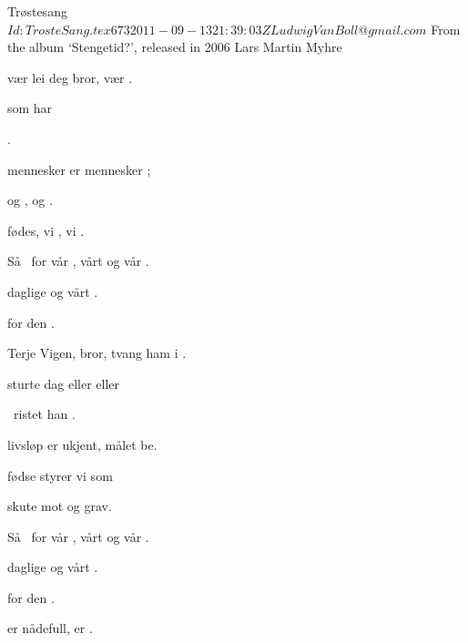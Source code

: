 \begin{SBSong}{Tr\o stesang}
  {$Id: TrosteSang.tex 673 2011-09-13 21:39:03Z LudwigVanBoll@gmail.com $}
  {From the album `Stengetid?', released in 2006}
  {Lars Martin Myhre}
  \begin{SBVerse}
	 v\ae r lei deg bror,  v\ae r . 

	  som  har 

	  .
	
	 mennesker er  mennesker ; 

	 og ,  og .

	 f\o des, vi , vi .
  \end{SBVerse}
  \begin{SBChorus}
	S\aa\  for v\aa r , v\aa rt  og v\aa r . 

	 daglige  og v\aa rt  . 

	 for den  .
  \end{SBChorus}
  \begin{SBVerse}
	 Terje Vigen, bror,  tvang ham i .

	 sturte  dag eller  eller  
	
	\ ristet han  .

	 livsl\o p er ukjent,  m\aa let be. 
	
	 f\o dse styrer vi  som  
	
	 skute mot  og  grav.
  \end{SBVerse}
  \begin{SBChorus}
	S\aa\  for v\aa r , v\aa rt  og v\aa r . 
	
	 daglige  og v\aa rt  . 
	
	 for den  .
  \end{SBChorus}
  \CBPageBrk
  \begin{SBVerse}
	 er n\aa defull,  er .


\end{SBVerse}
\end{SBSong}
